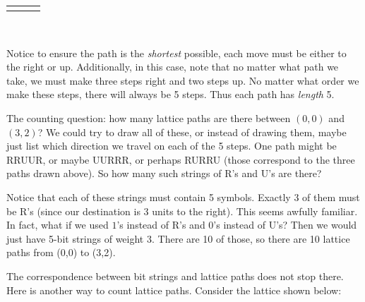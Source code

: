 \documentclass[12pt,]{book}
\theoremstyle{plain}
\theoremstyle{definition}
\theoremstyle{definition}
\theoremstyle{definition}
\numberwithin{equation}{chapter}
\newlength{\panelmax}
\begin{document}
{\leavevmode%
\setlength{\tabcolsep}{0.0166666666666667\linewidth}
\par\medskip\noindent
\hspace*{0.0166666666666667\linewidth}%
\begin{tabular}{@{}*{3}{c}@{}}
\begin{minipage}[c][\panelmax][t]{0.3\linewidth}\usebox{\panelboxAimage}\end{minipage}&
\begin{minipage}[c][\panelmax][t]{0.3\linewidth}\usebox{\panelboxBimage}\end{minipage}&
\begin{minipage}[c][\panelmax][t]{0.3\linewidth}\usebox{\panelboxCimage}\end{minipage}\end{tabular}\\
}%
\par
\hypertarget{p-840}{}%
Notice to ensure the path is the \emph{shortest} possible, each move must be either to the right or up. Additionally, in this case, note that no matter what path we take, we must make three steps right and two steps up. No matter what order we make these steps, there will always be 5 steps. Thus each path has \emph{length} 5.%
\par
\hypertarget{p-841}{}%
The counting question: how many lattice paths are there between \((0,0)\) and \((3,2)\)? We could try to draw all of these, or instead of drawing them, maybe just list which direction we travel on each of the 5 steps. One path might be RRUUR, or maybe UURRR, or perhaps RURRU (those correspond to the three paths drawn above). So how many such strings of R's and U's are there?%
\par
\hypertarget{p-842}{}%
Notice that each of these strings must contain 5 symbols. Exactly 3 of them must be R's (since our destination is 3 units to the right). This seems awfully familiar. In fact, what if we used \(1\)'s instead of R's and 0's instead of U's? Then we would just have 5-bit strings of weight 3. There are 10 of those, so there are 10 lattice paths from (0,0) to (3,2).%
\par
\hypertarget{p-843}{}%
The correspondence between bit strings and lattice paths does not stop there. Here is another way to count lattice paths. Consider the lattice shown below:%
\end{document}
